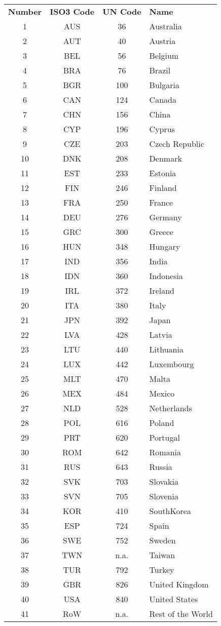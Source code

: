 
\begin{table}
\label{tab:cc_regions}
\begin{tabular}{ c c c l }
\textbf{Number} & \textbf{ISO3 Code} & \textbf{UN Code} & \textbf{Name}\\
1&AUS & 36 & Australia\\
2&AUT & 40 & Austria\\
3&BEL & 56 & Belgium\\
4&BRA & 76 & Brazil\\
5&BGR & 100 & Bulgaria\\
6&CAN & 124 & Canada\\
7&CHN & 156 & China\\
8&CYP & 196 & Cyprus\\
9&CZE & 203 & Czech Republic\\
10&DNK & 208 & Denmark\\
11&EST & 233 & Estonia\\
12&FIN & 246 & Finland\\
13&FRA & 250 & France\\
14&DEU & 276 & Germany\\
15&GRC & 300 & Greece\\
16&HUN & 348 & Hungary\\
17&IND & 356 & India\\
18&IDN & 360 & Indonesia\\
19&IRL & 372 & Ireland\\
20&ITA & 380 & Italy\\
21&JPN & 392 & Japan\\
22&LVA & 428 & Latvia\\
23 & LTU & 440 & Lithuania\\
24&LUX & 442 & Luxembourg\\
25&MLT & 470 & Malta\\
26&MEX & 484 & Mexico\\
27&NLD & 528 & Netherlands\\
28&POL & 616 & Poland\\
29&PRT & 620 & Portugal\\
30&ROM & 642 & Romania\\
31&RUS & 643 & Russia\\
32&SVK & 703 & Slovakia\\
33&SVN & 705 & Slovenia\\
34&KOR & 410 & SouthKorea\\
35&ESP & 724 & Spain\\
36&SWE & 752 & Sweden\\
37&TWN & n.a. & Taiwan\\
38&TUR & 792 & Turkey\\
39&GBR & 826 & United Kingdom\\
40&USA & 840 & United States\\
41& RoW & n.a. & Rest of the World\\
\end{tabular}


\end{table}
